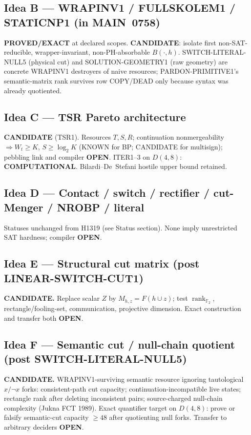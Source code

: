 \documentclass[11pt]{article}
\begin{document}
\subsection*{Idea B --- WRAPINV1 / FULLSKOLEM1 / STATICNP1 (in MAIN~0758)}
\textbf{PROVED/EXACT} at declared scopes.
\textbf{CANDIDATE}: isolate first non-SAT-reducible, wrapper-invariant, non-PH-absorbable $B(\cdot,h)$.
SWITCH-LITERAL-NULL5 (physical cut) and SOLUTION-GEOMETRY1 (raw geometry) are concrete
WRAPINV1 destroyers of naive resources; PARDON-PRIMITIVE1's semantic-matrix rank survives
row COPY/DEAD only because syntax was already quotiented.

\subsection*{Idea C --- TSR Pareto architecture}
\textbf{CANDIDATE} (TSR1). Resources $T,S,R$; continuation nonmergeability $\Rightarrow W_t\ge K$,
$S\ge\log_2 K$ (KNOWN for BP; CANDIDATE for multisign); pebbling link and compiler \textbf{OPEN}.
ITER1--3 on $D(4,8)$: \textbf{COMPUTATIONAL}. Bilardi--De~Stefani hostile upper bound retained.

\subsection*{Idea D --- Contact / switch / rectifier / cut-Menger / NROBP / literal}
Statuses unchanged from H1319 (see Status section). None imply unrestricted SAT hardness;
compiler \textbf{OPEN}.

\subsection*{Idea E --- Structural cut matrix (post LINEAR-SWITCH-CUT1)}
\textbf{CANDIDATE.} Replace scalar $Z$ by $M_{h,z}=F(h\cup z)$; test
$\operatorname{rank}_{\mathbb F_2}$, rectangle/fooling-set, communication, projective dimension.
Exact construction and transfer both \textbf{OPEN}.

\subsection*{Idea F --- Semantic cut / null-chain quotient (post SWITCH-LITERAL-NULL5)}
\textbf{CANDIDATE.} WRAPINV1-surviving semantic resource ignoring tautological $x/\neg x$
forks: consistent-path cut capacity; continuation-incompatible live states; rectangle rank
after deleting inconsistent pairs; source-charged null-chain complexity (Jukna FCT 1989).
Exact quantifier target on $D(4,8)$: prove or falsify semantic-cut capacity $\ge 48$
after quotienting null forks. Transfer to arbitrary deciders \textbf{OPEN}.
\end{document}
